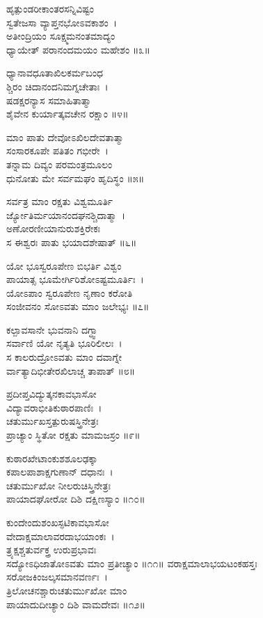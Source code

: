 ಹೃತ್ಪುಂಡರೀಕಾಂತರಸನ್ನಿವಿಷ್ಟಂ\\ಸ್ವತೇಜಸಾ ವ್ಯಾಪ್ತನಭೋಽವಕಾಶಂ~।\\
ಅತೀಂದ್ರಿಯಂ ಸೂಕ್ಷ್ಮಮನಂತಮಾದ್ಯಂ\\ಧ್ಯಾಯೇತ್ ಪರಾನಂದಮಯಂ ಮಹೇಶಂ ॥೩॥

ಧ್ಯಾನಾವಧೂತಾಖಿಲಕರ್ಮಬಂಧ\\ಶ್ಚಿರಂ ಚಿದಾನಂದನಿಮಗ್ನಚೇತಾಃ~।\\
ಷಡಕ್ಷರನ್ಯಾಸ ಸಮಾಹಿತಾತ್ಮಾ\\ಶೈವೇನ ಕುರ್ಯಾತ್ಕವಚೇನ ರಕ್ಷಾಂ ॥೪॥

ಮಾಂ ಪಾತು ದೇವೋಽಖಿಲದೇವತಾತ್ಮಾ\\ಸಂಸಾರಕೂಪೇ ಪತಿತಂ ಗಭೀರೇ~।\\
ತನ್ನಾಮ ದಿವ್ಯಂ ಪರಮಂತ್ರಮೂಲಂ\\ಧುನೋತು ಮೇ ಸರ್ವಮಘಂ ಹೃದಿಸ್ಥಂ ॥೫॥

ಸರ್ವತ್ರ ಮಾಂ ರಕ್ಷತು ವಿಶ್ವಮೂರ್ತಿ\\ರ್ಜ್ಯೋತಿರ್ಮಯಾನಂದಘನಶ್ಚಿದಾತ್ಮಾ~।\\
ಅಣೋರಣೀಯಾನುರುಶಕ್ತಿರೇಕಃ\\ಸ ಈಶ್ವರಃ ಪಾತು ಭಯಾದಶೇಷಾತ್ ॥೬॥

ಯೋ ಭೂಸ್ವರೂಪೇಣ ಬಿಭರ್ತಿ ವಿಶ್ವಂ\\ಪಾಯಾತ್ಸ ಭೂಮೇರ್ಗಿರಿಶೋಽಷ್ಟಮೂರ್ತಿಃ~।\\
ಯೋಽಪಾಂ ಸ್ವರೂಪೇಣ ನೃಣಾಂ ಕರೋತಿ\\ಸಂಜೀವನಂ ಸೋಽವತು ಮಾಂ ಜಲೇಭ್ಯಃ ॥೭॥

ಕಲ್ಪಾವಸಾನೇ ಭುವನಾನಿ ದಗ್ಧ್ವಾ\\ಸರ್ವಾಣಿ ಯೋ ನೃತ್ಯತಿ ಭೂರಿಲೀಲಃ~।\\
ಸ ಕಾಲರುದ್ರೋಽವತು ಮಾಂ ದವಾಗ್ನೇ\\ರ್ವಾತ್ಯಾದಿಭೀತೇರಖಿಲಾಚ್ಚ ತಾಪಾತ್ ॥೮॥

ಪ್ರದೀಪ್ತವಿದ್ಯುತ್ಕನಕಾವಭಾಸೋ\\ವಿದ್ಯಾವರಾಭೀತಿಕುಠಾರಪಾಣಿಃ~।\\
ಚತುರ್ಮುಖಸ್ತತ್ಪುರುಷಸ್ತ್ರಿನೇತ್ರಃ\\ಪ್ರಾಚ್ಯಾಂ ಸ್ಥಿತೋ ರಕ್ಷತು ಮಾಮಜಸ್ರಂ ॥೯॥

ಕುಠಾರಖೇಟಾಂಕುಶಶೂಲಢಕ್ಕಾ\\ಕಪಾಲಪಾಶಾಕ್ಷಗುಣಾನ್ ದಧಾನಃ~।\\
ಚತುರ್ಮುಖೋ ನೀಲರುಚಿಸ್ತ್ರಿನೇತ್ರಃ\\ಪಾಯಾದಘೋರೋ ದಿಶಿ ದಕ್ಷಿಣಸ್ಯಾಂ ॥೧೦॥

ಕುಂದೇಂದುಶಂಖಸ್ಫಟಿಕಾವಭಾಸೋ\\ವೇದಾಕ್ಷಮಾಲಾವರದಾಭಯಾಂಕಃ~।\\
ತ್ರ್ಯಕ್ಷಶ್ಚತುರ್ವಕ್ತ್ರ ಉರುಪ್ರಭಾವಃ\\ಸದ್ಯೋಽಧಿಜಾತೋಽವತು ಮಾಂ ಪ್ರತೀಚ್ಯಾಂ ॥೧೧॥
\newpage
 ವರಾಕ್ಷಮಾಲಾಭಯಟಂಕಹಸ್ತಃ\\ಸರೋಜಕಿಂಜಲ್ಕಸಮಾನವರ್ಣಃ~।\\
ತ್ರಿಲೋಚನಶ್ಚಾರುಚತುರ್ಮುಖೋ ಮಾಂ\\ಪಾಯಾದುದೀಚ್ಯಾಂ ದಿಶಿ ವಾಮದೇವಃ ॥೧೨॥

